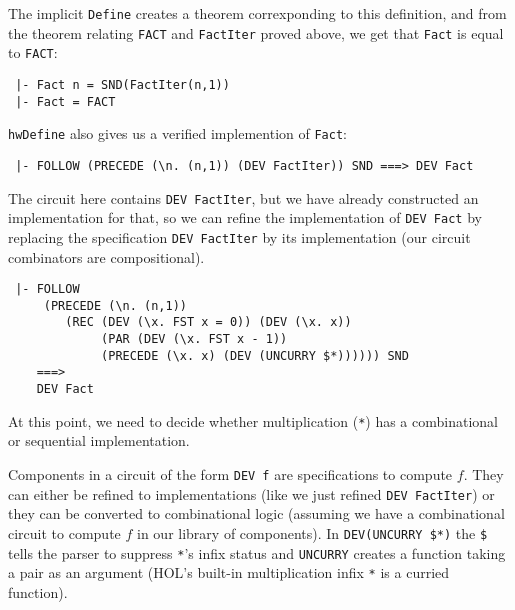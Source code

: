\vspace*{-2mm}

\noindent The implicit \texttt{Define} creates a
theorem correxponding to this definition, and from the
theorem relating \texttt{FACT} and \texttt{FactIter} proved above,
we get that \texttt{Fact} is equal to \texttt{FACT}:

\vspace*{-2mm}

{\baselineskip10pt\begin{verbatim}
 |- Fact n = SND(FactIter(n,1))
 |- Fact = FACT
\end{verbatim}}

\vspace*{-2mm}

\noindent \texttt{hwDefine} also gives us a verified implemention of
\texttt{Fact}:

\vspace*{-2mm}

{\baselineskip10pt\begin{verbatim}
 |- FOLLOW (PRECEDE (\n. (n,1)) (DEV FactIter)) SND ===> DEV Fact
\end{verbatim}}

\vspace*{-2mm}

\noindent The circuit here contains \texttt{DEV~FactIter}, but we have
already constructed an implementation for that, so we can refine the
implementation of \texttt{DEV~Fact} by replacing the specification
\texttt{DEV~FactIter} by its implementation (our circuit combinators
are compositional).

\vspace*{-2mm}

{\baselineskip10pt\begin{verbatim}
 |- FOLLOW
     (PRECEDE (\n. (n,1))
        (REC (DEV (\x. FST x = 0)) (DEV (\x. x))
             (PAR (DEV (\x. FST x - 1))
             (PRECEDE (\x. x) (DEV (UNCURRY $*)))))) SND 
    ===> 
    DEV Fact
\end{verbatim}}

\vspace*{-2mm}

At this point, we need to decide whether multiplication (\texttt{*})
has a combinational or sequential implementation. 

Components in a
circuit of the form \texttt{DEV~f} are specifications to compute
$f$. They can either be refined to implementations (like we just
refined \texttt{DEV~FactIter}) or they can be converted to
combinational logic (assuming we have a combinational circuit to
compute $f$ in our library of components).
In \texttt{DEV(UNCURRY~\$*)} the \texttt{\$} tells the parser to
suppress \texttt{*}'s infix status and \texttt{UNCURRY} creates a
function taking a pair as an argument (HOL's built-in multiplication infix \texttt{*}
is a curried function).


